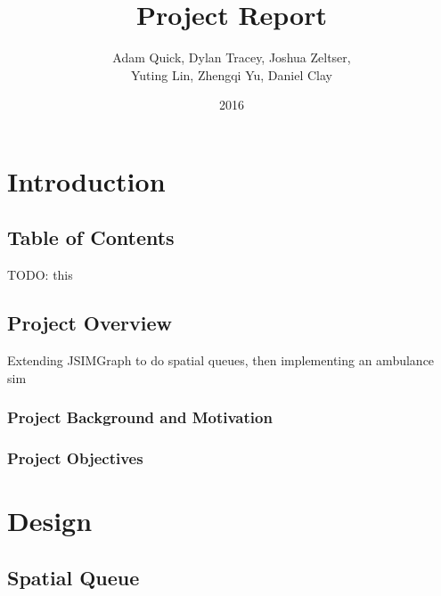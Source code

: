 \documentclass[a4paper]{article}
\begin{document}
\title{Project Report}
\date{2016}
\author{Adam Quick, Dylan Tracey, Joshua Zeltser, \\Yuting Lin, Zhengqi Yu, Daniel Clay}
\maketitle

\section{Introduction}

\subsection{Table of Contents}%

TODO: this

\subsection{Project Overview}%

Extending JSIMGraph to do spatial queues, then implementing an ambulance sim

\subsubsection{Project Background and Motivation}

\subsubsection{Project Objectives}

\section{Design}

\subsection{Spatial Queue}%
\end{document}
